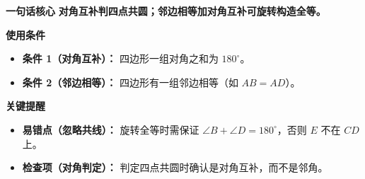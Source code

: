 \begin{summarybox}
	\textbf{\textcolor{CSummary}{一句话核心}}
	\textbf{对角互补判四点共圆；邻边相等加对角互补可旋转构造全等。}

	\medskip
	\textbf{\textcolor{CSummary}{使用条件}}
	\begin{itemize}[leftmargin=*, itemsep=0.5em, topsep=0.4em]
		\item \textbf{条件 1（对角互补）：} 四边形一组对角之和为 $180^\circ$。
		\item \textbf{条件 2（邻边相等）：} 四边形有一组邻边相等（如 $AB=AD$）。
	\end{itemize}

	\medskip
	\textbf{\textcolor{CSummary}{关键提醒}}
	\begin{itemize}[leftmargin=*, itemsep=0.5em, topsep=0.4em]
		\item \textbf{易错点（忽略共线）：} 旋转全等时需保证 $\angle B+\angle D=180^\circ$，否则 $E$ 不在 $CD$ 上。
		\item \textbf{检查项（对角判定）：} 判定四点共圆时确认是对角互补，而不是邻角。
	\end{itemize}

\end{summarybox}
